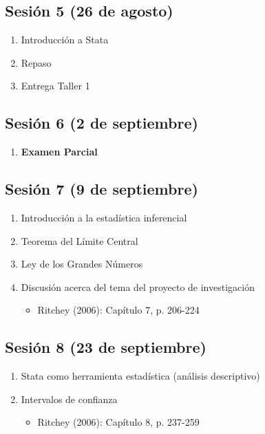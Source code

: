 \documentclass[letterpaper]{article}
\begin{document}
\subsection{Sesión 5 (26 de agosto)}
\begin{enumerate}
\item Introducción a Stata
\item Repaso
\item Entrega Taller 1
\end{enumerate}

\subsection{Sesión 6 (2 de septiembre)}
\begin{enumerate}
\item {\bf Examen Parcial}
\end{enumerate}

\subsection{Sesión 7 (9 de septiembre)}
\begin{enumerate}
\item Introducción a la
estadística inferencial
\item Teorema del Límite Central
\item Ley de los Grandes Números
\item Discusión acerca del tema del proyecto de investigación

\begin{itemize}
\item Ritchey (2006):
Capítulo 7, p.
206-224
\end{itemize}
\end{enumerate}

\subsection{Sesión 8 (23 de septiembre)}
\begin{enumerate}
\item Stata como herramienta estadística (análisis descriptivo)
\item Intervalos de confianza
\begin{itemize}
\item Ritchey (2006):
Capítulo 8, p.
237-259

\end{itemize}
\end{enumerate}
\end{document}
